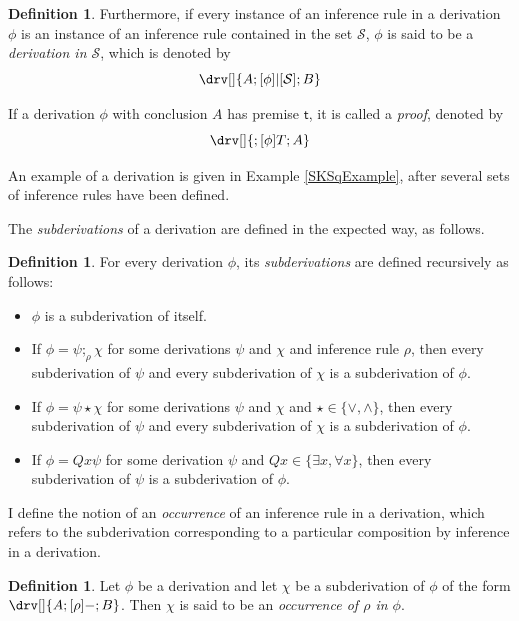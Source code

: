 \documentclass[10pt]{article}
\theoremstyle{definition}\newtheorem{remark}[theorem]{Remark}
\theoremstyle{definition}\newtheorem{example}[theorem]{Example}
\theoremstyle{definition}\newtheorem{definition}[theorem]{Definition}
\newcommand{\trueUnit}{\mathsf{t}}
\newcommand{\compByInf}[1]{;_{#1}}
\begin{document}
\begin{definition}
		Furthermore, if every instance of an inference rule in a derivation $\phi$ is an instance of an inference rule contained in the set $\mathcal{S}$, $\phi$ is said to be a \textit{derivation in $\mathcal{S}$}, which is denoted by
		\[
		\drv[] {
			A ; [\phi]|[\mathcal{S}] ; B
		}
		\]
		
		If a derivation $\phi$ with conclusion $A$ has premise $\trueUnit$, it is called a \textit{proof}, denoted by
		\[
			\drv[] {; [\phi]T ; A}
		\]
	\end{definition}

	An example of a derivation is given in Example \ref{SKSqExample}, after several sets of inference rules have been defined.

	The \textit{subderivations} of a derivation are defined in the expected way, as follows.
	
	\begin{definition}
		For every derivation $\phi$, its \textit{subderivations} are defined recursively as follows:
		
		\begin{itemize}
			\item $\phi$ is a subderivation of itself.
			
			\item If $\phi = \psi \compByInf{\rho} \chi$ for some derivations $\psi$ and $\chi$ and inference rule $\rho$, then every subderivation of $\psi$ and every subderivation of $\chi$ is a subderivation of $\phi$.
			
			\item If $\phi = \psi \star \chi$ for some derivations $\psi$ and $\chi$ and $\star \in \{\lor, \land\}$, then every subderivation of $\psi$ and every subderivation of $\chi$ is a subderivation of $\phi$.
			
			\item If $\phi = Qx \psi$ for some derivation $\psi$ and $Qx \in \{\exists x, \forall x\}$, then every subderivation of $\psi$ is a subderivation of $\phi$.
		\end{itemize}
	\end{definition}

	I define the notion of an \textit{occurrence} of an inference rule in a derivation, which refers to the subderivation corresponding to a particular composition by inference in a derivation.
	
	\begin{definition}
		Let $\phi$ be a derivation and let $\chi$ be a subderivation of $\phi$ of the form $\drv[] {A ; [\rho]- ; B}$. Then $\chi$ is said to be an \textit{occurrence of $\rho$ in $\phi$}.
	\end{definition}
	
\end{document}
